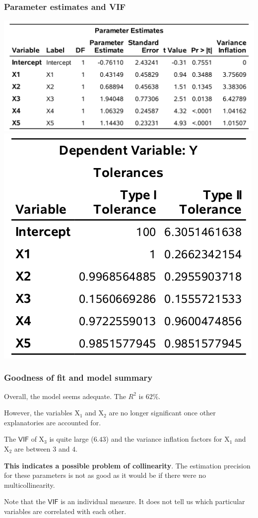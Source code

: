 \documentclass{beamer}
\begin{document}
 \begin{frame}
\frametitle{Parameter estimates and VIF}
\begin{center}
\includegraphics[width= 0.8\linewidth]{img/c2/slides3-e25}
\includegraphics[width= 0.4\linewidth]{img/c2/slides3-e26}
\end{center}
\end{frame}

\begin{frame}[fragile]
\frametitle{Goodness of fit and model summary}
\bi
\item Overall, the model seems adequate. The $R^2$ is $62\%$. 
\item However, the variables $\mathrm{X}_1$ and $\mathrm{X}_2$ are no longer significant once other explanatories are accounted for.
\item The $\mathsf{VIF}$ of $\mathrm{X}_3$ is quite large ($6.43$) and the variance inflation factors for $\mathrm{X}_1$ and $\mathrm{X}_2$ are between $3$ and $4$.
\item \textbf{This indicates a possible problem of collinearity}. The estimation precision for these parameters is not as good as it would be if there were no multicollinearity. 
\item Note that the $\mathsf{VIF}$ is an individual measure. It does not tell us which particular variables are correlated with each other.
\ei
\end{frame}
\end{document}
